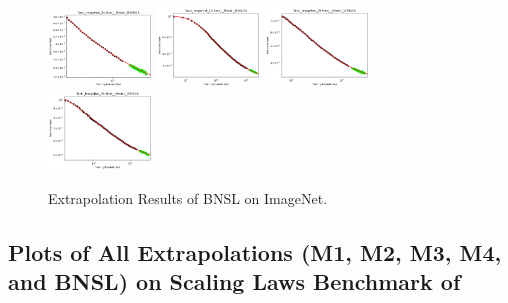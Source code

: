 \documentclass{article} %
\begin{document}
\begin{figure}
\includegraphics[width=0.245\textwidth]{figures/scaling_laws_benchmark_dataset_plots/few_shot_25___MiX_B_16.png}
\includegraphics[width=0.245\textwidth]{figures/scaling_laws_benchmark_dataset_plots/few_shot_25___MiX_L_16.png}
\includegraphics[width=0.245\textwidth]{figures/scaling_laws_benchmark_dataset_plots/few_shot_25___ViT_B_16.png}
\includegraphics[width=0.245\textwidth]{figures/scaling_laws_benchmark_dataset_plots/few_shot_25___ViT_S_16.png}

    \caption{
    Extrapolation Results of BNSL on ImageNet.
    }
    \label{fig:scaling_laws_benchmark_dataset__ImageNet}
\end{figure}

\iffalse



\clearpage
\clearpage
\subsection{Plots of All Extrapolations (M1, M2, M3, M4, and BNSL) on Scaling Laws Benchmark of \cite{Alabdulmohsi2022revisiting}}
\label{section:Plots_of_All_Extrapolations}
\end{document}
